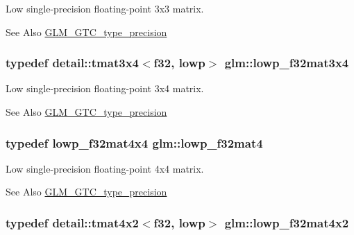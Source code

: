 Low single-\/precision floating-\/point 3x3 matrix. \begin{DoxySeeAlso}{See Also}
\hyperlink{group__gtc__type__precision}{G\-L\-M\-\_\-\-G\-T\-C\-\_\-type\-\_\-precision} 
\end{DoxySeeAlso}
\hypertarget{group__gtc__type__precision_ga7f81032f05c8a1b96b33c328f38c72d3}{
\subsubsection[{lowp\-\_\-f32mat3x4}]{\setlength{\rightskip}{0pt plus 5cm}typedef detail\-::tmat3x4$<$f32, lowp$>$ {\bf glm\-::lowp\-\_\-f32mat3x4}}}\label{group__gtc__type__precision_ga7f81032f05c8a1b96b33c328f38c72d3}
Low single-\/precision floating-\/point 3x4 matrix. \begin{DoxySeeAlso}{See Also}
\hyperlink{group__gtc__type__precision}{G\-L\-M\-\_\-\-G\-T\-C\-\_\-type\-\_\-precision} 
\end{DoxySeeAlso}
\hypertarget{group__gtc__type__precision_gada4d11f44b410c1be7b6b1d05ccf692c}{
\subsubsection[{lowp\-\_\-f32mat4}]{\setlength{\rightskip}{0pt plus 5cm}typedef lowp\-\_\-f32mat4x4 {\bf glm\-::lowp\-\_\-f32mat4}}}\label{group__gtc__type__precision_gada4d11f44b410c1be7b6b1d05ccf692c}
Low single-\/precision floating-\/point 4x4 matrix. \begin{DoxySeeAlso}{See Also}
\hyperlink{group__gtc__type__precision}{G\-L\-M\-\_\-\-G\-T\-C\-\_\-type\-\_\-precision} 
\end{DoxySeeAlso}
\hypertarget{group__gtc__type__precision_ga6eedee3981e5bf150ad7463786d0d694}{
\subsubsection[{lowp\-\_\-f32mat4x2}]{\setlength{\rightskip}{0pt plus 5cm}typedef detail\-::tmat4x2$<$f32, lowp$>$ {\bf glm\-::lowp\-\_\-f32mat4x2}}}\label{group__gtc__type__precision_ga6eedee3981e5bf150ad7463786d0d694}
